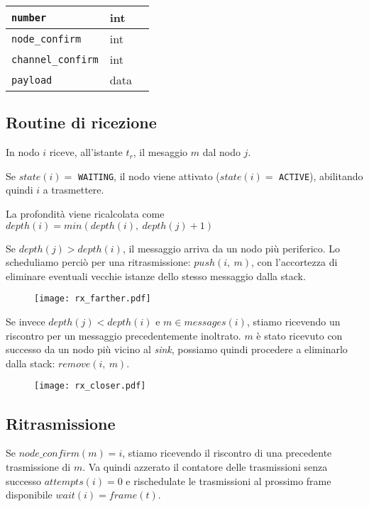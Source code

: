 \documentclass[a4paper,12pt]{article}
\theoremstyle{definition}
\begin{document}
\begin{table}[H]
\centering
\begin{tabular}{| l | l | l |}
\hline
\texttt{number} & int & \\ \hline
\texttt{node\_confirm} & int & \\ \hline
\texttt{channel\_confirm} & int & \\ \hline
\texttt{payload} & data & \\ \hline
\end{tabular}
\caption{}
\end{table}

\subsection{Routine di ricezione}

In nodo $i$ riceve, all'istante $t_r$, il mesaggio $m$ dal nodo $j$.

Se $state(i) =$ \texttt{WAITING}, il nodo viene attivato ($state(i) =$ \texttt{ACTIVE}), abilitando quindi $i$ a trasmettere.

La profondità viene ricalcolata come $depth(i) = min(depth(i),\ depth(j)+1)$

Se $depth(j) > depth(i)$, il messaggio arriva da un nodo più periferico. Lo scheduliamo perciò per una ritrasmissione: $push(i,\ m)$, con l'accortezza di eliminare eventuali vecchie istanze dello stesso messaggio dalla stack.

\begin{figure}[H]
\centering
\texttt{[image: rx\_farther.pdf]}
\caption{}
\end{figure}

Se invece $depth(j) < depth(i)$ e $m \in messages(i)$, stiamo ricevendo un riscontro per un messaggio precedentemente inoltrato. $m$ è stato ricevuto con successo da un nodo più vicino al \emph{sink}, possiamo quindi procedere a eliminarlo dalla stack: $remove(i,\ m)$.

\begin{figure}[H]
\centering
\texttt{[image: rx\_closer.pdf]}
\caption{}
\end{figure}

\subsection{Ritrasmissione}

Se $node\_confirm(m) = i$, stiamo ricevendo il riscontro di una precedente trasmissione di $m$. Va quindi azzerato il contatore delle trasmissioni senza successo $attempts(i) = 0$ e rischedulate le trasmissioni al prossimo frame disponibile $wait(i) = frame(t)$.
\end{document}

